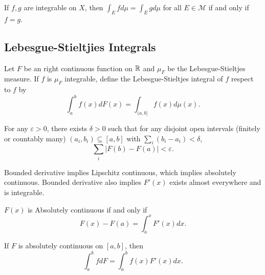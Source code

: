 \documentclass[class=book, crop=false]{standalone}
\begin{document}
        \begin{theorem}
            If $f, g$ are integrable on $X$, then $\int_E f d\mu = \int_E g d\mu$ for all $E \in \mathscr{M}$ if and only if $f = g$.
        \end{theorem}

        \subsection{Lebesgue-Stieltjies Integrals}
        \begin{definition}
            Let $F$ be an right continuous function on $\mathbb{R}$ and $\mu_F$ be the Lebesgue-Stieltjes measure. If $f$ is $\mu_F$ integrable, define the Lebesgue-Stieltjes integral of $f$ respect to $f$ by
            \begin{equation*}
                \int^b_a f(x) dF(x) = \int_{(a, b]} f(x) d\mu(x).
            \end{equation*}
        \end{definition}

        \begin{definition}
            For any $\varepsilon > 0$, there exists $\delta > 0$ such that for any disjoint open intervals (finitely or countably many) $(a_i, b_i) \subseteq [a, b]$ with $\sum_i (b_i - a_i) < \delta$,
            \begin{equation*}
                \sum_i |F(b) - F(a)| < \varepsilon.
            \end{equation*}
        \end{definition}
        \begin{remark}
            Bounded derivative implies Lipschitz continuous, which implies absolutely continuous. Bounded derivative also implies $F'(x)$ exists almost everywhere and is integrable.
        \end{remark}
        \begin{remark}
            $F(x)$ is Absolutely continuous if and only if
            \begin{equation*}
                F(x) - F(a) = \int^x_a F'(x) dx.
            \end{equation*}
        \end{remark}

        \begin{theorem}
            If $F$ is absolutely continuous on $[a, b]$, then
            \begin{equation*}
                \int^b_a f dF = \int^b_a f(x) F'(x) dx.
            \end{equation*}
        \end{theorem}
\end{document}
